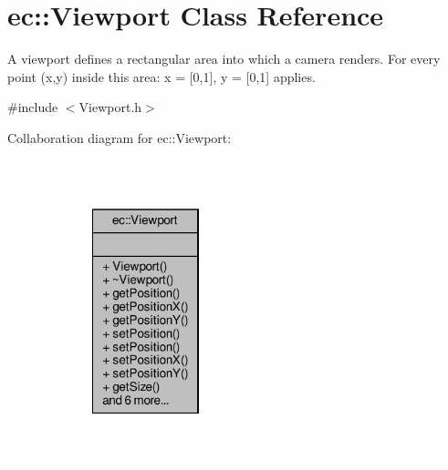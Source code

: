 \hypertarget{classec_1_1_viewport}{}\section{ec\+:\+:Viewport Class Reference}
\label{classec_1_1_viewport}


A viewport defines a rectangular area into which a camera renders. For every point (x,y) inside this area\+: x = \mbox{[}0,1\mbox{]}, y = \mbox{[}0,1\mbox{]} applies.  




{\ttfamily \#include $<$Viewport.\+h$>$}



Collaboration diagram for ec\+:\+:Viewport\+:\nopagebreak
\begin{figure}[H]
\begin{center}
\leavevmode
\includegraphics[width=167pt]{classec_1_1_viewport__coll__graph}
\end{center}
\end{figure}
